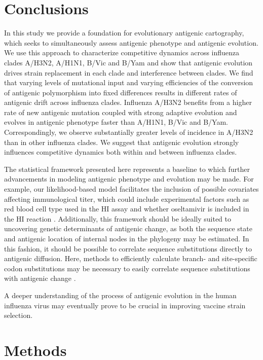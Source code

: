 \documentclass[11pt,oneside,letterpaper]{article}
\begin{document}
\section*{Conclusions}

In this study we provide a foundation for evolutionary antigenic cartography, which seeks to simultaneously assess antigenic phenotype and antigenic evolution.
We use this approach to characterize competitive dynamics across influenza clades A/H3N2, A/H1N1, B/Vic and B/Yam and show that antigenic evolution drives strain replacement in each clade and interference between clades.
We find that varying levels of mutational input and varying efficiencies of the conversion of antigenic polymorphism into fixed differences results in different rates of antigenic drift across influenza clades.
Influenza A/H3N2 benefits from a higher rate of new antigenic mutation coupled with strong adaptive evolution and evolves in antigenic phenotype faster than A/H1N1, B/Vic and B/Yam.
Correspondingly, we observe substantially greater levels of incidence in A/H3N2 than in other influenza clades.
We suggest that antigenic evolution strongly influences competitive dynamics both within and between influenza clades.

The statistical framework presented here represents a baseline to which further advancements in modeling antigenic phenotype and evolution may be made.
For example, our likelihood-based model facilitates the inclusion of possible covariates affecting immunological titer, which could include experimental factors such as red blood cell type used in the HI assay \cite{Lin12} and whether oseltamivir is included in the HI reaction \cite{Lin10}.
Additionally, this framework should be ideally suited to uncovering genetic determinants of antigenic change, as both the sequence state and antigenic location of internal nodes in the phylogeny may be estimated.
In this fashion, it should be possible to correlate sequence substitutions directly to antigenic diffusion.
Here, methods to efficiently calculate branch- and site-specific codon substitutions may be necessary to easily correlate sequence substitutions with antigenic change \cite{Lemey12}.

A deeper understanding of the process of antigenic evolution in the human influenza virus may eventually prove to be crucial in improving vaccine strain selection.

\section*{Methods}
\end{document}
